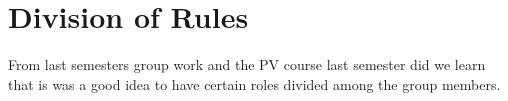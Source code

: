 \section{Division of Rules}
From last semesters group work and the PV course last semester did we learn that is was a good idea to have certain roles divided among the group members. 